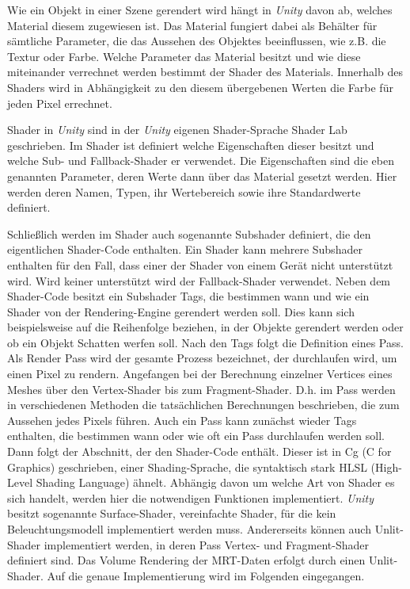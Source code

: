 Wie ein Objekt in einer Szene gerendert wird hängt in \textit{Unity} davon ab, welches Material diesem zugewiesen ist. Das Material fungiert dabei als Behälter für sämtliche Parameter, die das Aussehen des Objektes beeinflussen, wie z.B. die Textur oder Farbe. Welche Parameter das Material besitzt und wie diese miteinander verrechnet werden bestimmt der Shader des Materials. Innerhalb des Shaders wird in Abhängigkeit zu den diesem übergebenen Werten die Farbe für jeden Pixel errechnet. 

Shader in \textit{Unity} sind in der \textit{Unity} eigenen Shader-Sprache Shader Lab geschrieben. Im Shader ist definiert welche Eigenschaften dieser besitzt und welche Sub- und Fallback-Shader er verwendet.
Die Eigenschaften sind die eben genannten Parameter, deren Werte dann über das Material gesetzt werden. Hier werden deren Namen, Typen, ihr Wertebereich sowie ihre Standardwerte definiert. 

Schließlich werden im Shader auch sogenannte Subshader definiert, die den eigentlichen Shader-Code enthalten.
Ein Shader kann mehrere Subshader enthalten für den Fall, dass einer der Shader von einem Gerät nicht unterstützt wird. Wird keiner unterstützt wird der Fallback-Shader verwendet. 
Neben dem Shader-Code besitzt ein Subshader Tags, die bestimmen wann und wie ein Shader von der Rendering-Engine gerendert werden soll. Dies kann sich beispielsweise auf die Reihenfolge beziehen, in der Objekte gerendert werden oder ob ein Objekt Schatten werfen soll. 
Nach den Tags folgt die Definition eines Pass. Als Render Pass wird der gesamte Prozess bezeichnet, der durchlaufen wird, um einen Pixel zu rendern. Angefangen bei der Berechnung einzelner Vertices eines Meshes über den Vertex-Shader bis zum Fragment-Shader. D.h. im Pass werden in verschiedenen Methoden die tatsächlichen Berechnungen beschrieben, die zum Aussehen jedes Pixels führen. 
Auch ein Pass kann zunächst wieder Tags enthalten, die bestimmen wann oder wie oft ein Pass durchlaufen werden soll. 
Dann folgt der Abschnitt, der den Shader-Code enthält. Dieser ist in Cg (C for Graphics)
 geschrieben, einer Shading-Sprache, die syntaktisch stark HLSL (High-Level Shading Language) ähnelt. 
Abhängig davon um welche Art von Shader es sich handelt, werden hier die notwendigen Funktionen implementiert. \textit{Unity} besitzt sogenannte Surface-Shader,  vereinfachte Shader, für die kein Beleuchtungsmodell implementiert werden muss. Andererseits können auch Unlit-Shader implementiert werden, in deren Pass Vertex- und Fragment-Shader definiert sind. 
Das Volume Rendering der MRT-Daten erfolgt durch einen Unlit-Shader. Auf die genaue Implementierung wird im Folgenden eingegangen. 

